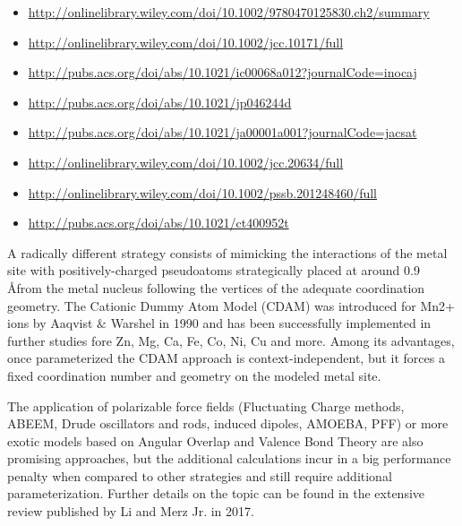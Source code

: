 \begin{itemize}
	\item \href{http://onlinelibrary.wiley.com/doi/10.1002/9780470125830.ch2/summary}{http://onlinelibrary.wiley.com/doi/10.1002/9780470125830.ch2/summary}

	\item \href{http://onlinelibrary.wiley.com/doi/10.1002/jcc.10171/full}{http://onlinelibrary.wiley.com/doi/10.1002/jcc.10171/full}

	\item \href{http://pubs.acs.org/doi/abs/10.1021/ic00068a012?journalCode=inocaj}{http://pubs.acs.org/doi/abs/10.1021/ic00068a012?journalCode=inocaj}

	\item \href{http://pubs.acs.org/doi/abs/10.1021/jp046244d}{http://pubs.acs.org/doi/abs/10.1021/jp046244d}

	\item \href{http://pubs.acs.org/doi/abs/10.1021/ja00001a001?journalCode=jacsat}{http://pubs.acs.org/doi/abs/10.1021/ja00001a001?journalCode=jacsat}

	\item \href{http://onlinelibrary.wiley.com/doi/10.1002/jcc.20634/full}{http://onlinelibrary.wiley.com/doi/10.1002/jcc.20634/full}

	\item \href{http://onlinelibrary.wiley.com/doi/10.1002/pssb.201248460/full}{http://onlinelibrary.wiley.com/doi/10.1002/pssb.201248460/full}

	\item \href{http://pubs.acs.org/doi/abs/10.1021/ct400952t}{http://pubs.acs.org/doi/abs/10.1021/ct400952t}
\end{itemize}

A radically different strategy consists of mimicking the interactions of the metal site with positively-charged pseudoatoms strategically placed at around 0.9 \AA from the metal nucleus following the vertices of the adequate coordination geometry. The Cationic Dummy Atom Model (CDAM) was introduced for Mn2+ ions by Aaqvist $\&$  Warshel in 1990\cite{aaqvist1990} and has been successfully implemented in further studies fore Zn, Mg, Ca, Fe, Co, Ni, Cu and more.\cite{duarte2014,lu2012proteins,Oelschlaeger_2007,Saxena_2013,Saxena_2014,Liao_2015,Pang_1999} Among its advantages, once parameterized the CDAM approach is context-independent, but it forces a fixed coordination number and geometry on the modeled metal site.

The application of polarizable force fields (Fluctuating Charge methods, ABEEM, Drude oscillators and rods, induced dipoles, AMOEBA, PFF) or more exotic models based on Angular Overlap and Valence Bond Theory are also promising approaches, but the additional calculations incur in a big performance penalty when compared to other strategies and still require additional parameterization. Further details on the topic can be found in the extensive review published by Li and Merz Jr. in 2017.\cite{li2017}

